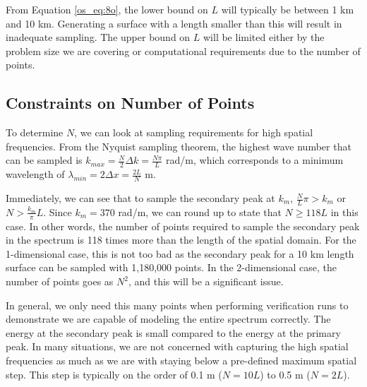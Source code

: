 From Equation \ref{os_eq:8o}, the lower bound on $L$ will typically be between 1 km and 10 km. Generating a surface with a length smaller than this will result in inadequate sampling. The upper bound on $L$ will be limited either by the problem size we are covering or computational requirements due to the number of points.

\subsection{Constraints on Number of Points}
To determine $N$, we can look at sampling requirements for high spatial frequencies. From the Nyquist sampling theorem, the highest wave number that can be sampled is $k_{max} = \frac{N}{2}\Delta k = \frac{N\pi}{L}$ rad/m, which corresponds to a minimum wavelength of $\lambda_{min} = 2\Delta x = \frac{2L}{N}$ m.

Immediately, we can see that to sample the secondary peak at $k_m$, $\frac{N}{L}\pi > k_m$ or $N > \frac{k_m}{\pi}L$. Since $k_m = 370$ rad/m, we can round up to state that $N \geq 118L$ in this case. In other words, the number of points required to sample the secondary peak in the spectrum is 118 times more than the length of the spatial domain. For the 1-dimensional case, this is not too bad as the secondary peak for a 10 km length surface can be sampled with 1,180,000 points. In the 2-dimensional case, the number of points goes as $N^2$, and this will be a significant issue.

In general, we only need this many points when performing verification runs to demonstrate we are capable of modeling the entire spectrum correctly. The energy at the secondary peak is small compared to the energy at the primary peak. In many situations, we are not concerned with capturing the high spatial frequencies as much as we are with staying below a pre-defined maximum spatial step. This step is typically on the order of 0.1 m ($N = 10L$) to 0.5 m ($N = 2L$).

